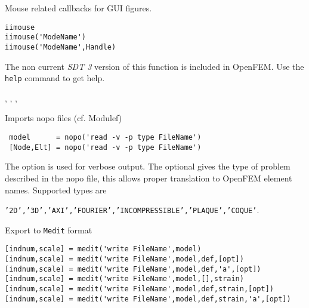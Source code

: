 



\noindent Mouse related callbacks for GUI figures.

\rsyntax\begin{verbatim}
iimouse
iimouse('ModeName')
iimouse('ModeName',Handle)
\end{verbatim}\nlvs



The non current {\sl SDT 3} version of this function is included in OpenFEM. Use the {\tt help}  command to get help.



\noindent  \iicom, \fecom, \iiplot, \iiplot




Imports nopo files (cf. Modulef)

\rsyntax\begin{verbatim}
 model      = nopo('read -v -p type FileName')
 [Node,Elt] = nopo('read -v -p type FileName')
\end{verbatim}\nlvs

 
 The  option is used for verbose output. The optional   gives the type of problem described in the nopo file, this allows proper translation to OpenFEM element names.  Supported types are

 {\tt '2D','3D','AXI','FOURIER','INCOMPRESSIBLE','PLAQUE','COQUE'}.

  \medit



Export to {\tt Medit} format

\rsyntax\begin{verbatim}
[indnum,scale] = medit('write FileName',model)
[indnum,scale] = medit('write FileName',model,def,[opt])
[indnum,scale] = medit('write FileName',model,def,'a',[opt])
[indnum,scale] = medit('write FileName',model,[],strain)
[indnum,scale] = medit('write FileName',model,def,strain,[opt])
[indnum,scale] = medit('write FileName',model,def,strain,'a',[opt])
\end{verbatim}\nlvs


